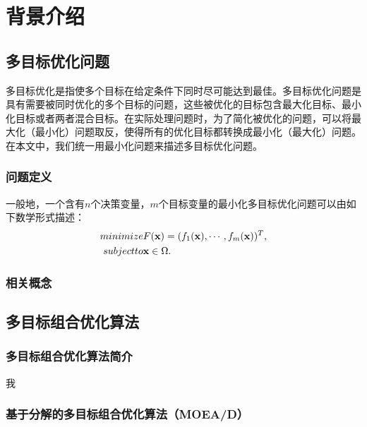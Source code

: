 \chapter{背景介绍}

\section{多目标优化问题}

多目标优化是指使多个目标在给定条件下同时尽可能达到最佳。多目标优化问题是具有需要被同时优化的多个目标的问题，这些被优化的目标包含最大化目标、最小化目标或者两者混合目标。在实际处理问题时，为了简化被优化的问题，可以将最大化（最小化）问题取反，使得所有的优化目标都转换成最小化（最大化）问题。在本文中，我们统一用最小化问题来描述多目标优化问题。

\subsection{问题定义}

一般地，一个含有$n$个决策变量，$m$个目标变量的最小化多目标优化问题可以由如下数学形式描述：
\begin{align}
    \label{eq:MOP}
    minimize & F(\mathbf{x}) = (f_1(\mathbf{x}), \cdots, f_m(\mathbf{x}))^T,  \\
    subject to & \mathbf{x} \in \Omega. \notag
\end{align}

\subsection{相关概念}


\section{多目标组合优化算法}

\subsection{多目标组合优化算法简介}

我

\subsection{基于分解的多目标组合优化算法（MOEA/D）}

